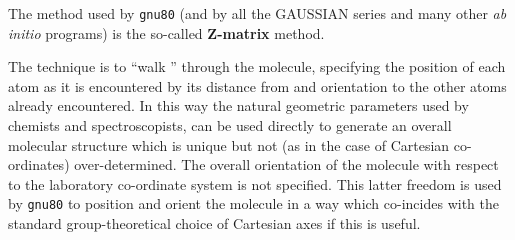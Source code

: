 The method used by {\tt gnu80} (and by all the GAUSSIAN series and
many other {\em ab initio} programs) is the so-called
{\bf Z-matrix} method.

The technique is to ``walk '' through the molecule,
specifying the position of each atom as it is encountered by
its distance from and orientation to the other atoms already
encountered. In this way the natural geometric parameters used by
chemists and spectroscopists, can be used directly to generate 
an overall molecular structure which is unique but not (as in
the case of Cartesian co-ordinates) over-determined. The
overall orientation of the molecule with respect to the
laboratory co-ordinate system is not specified. This latter
freedom is used by {\tt gnu80} to position and orient the molecule
in a way which co-incides with the standard group-theoretical
choice of Cartesian axes if this is useful.

